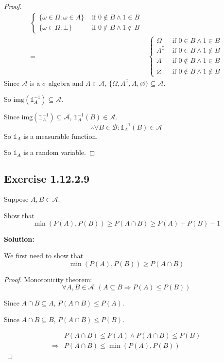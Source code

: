 \documentclass{article}
\begin{document}
\begin{proof}
\begin{align*}
\begin{cases}
    \{\omega\in\Omega:\omega\in A\}&\text{ if }0\notin B\wedge 1\in B\\
    \{\omega\in\Omega:\bot\}&\text{ if }0\notin B\wedge 1\notin B
    \end{cases} \\
    =& \begin{cases}
    \Omega &\text{ if }0\in B\wedge 1\in B\\
    A^\complement&\text{ if }0\in B\wedge 1\notin B\\
    A&\text{ if }0\notin B\wedge 1\in B\\
    \varnothing&\text{ if }0\notin B\wedge 1\notin B
    \end{cases}
\end{align*}
Since \(\mathcal{A}\) is a \(\sigma\)-algebra and \(A\in \mathcal{A}\), \(\{\Omega, A^\complement, A, \varnothing\}\subseteq \mathcal{A}\).

So \(\mathrm{img}(\mathds{1}_A^{-1}) \subseteq \mathcal{A}\).

Since \(\mathrm{img}(\mathds{1}_A^{-1})\subseteq \mathcal{A}\), \(\mathds{1}_A^{-1}(B)\in \mathcal{A}\).
\[\therefore \forall B\in \mathcal{B}: \mathds{1}_A^{-1}(B)\in \mathcal{A}\]
So \(\mathds{1}_A\) is a measurable function.

So \(\mathds{1}_A\) is a random variable.
\end{proof}

\subsection{Exercise 1.12.2.9}

Suppose \(A,B \in \mathcal{A}\).

Show that
\[\min(P(A),P(B)) \geq P(A\cap B) \geq P(A)+P(B)-1\]

\textbf{Solution:}

We first need to show that
\[\min(P(A), P(B)) \geq P(A \cap B)\]

\begin{proof}
Monotonicity theorem:
\[\forall A,B\in \mathcal{A}: (A\subseteq B \Rightarrow P(A)\leq P(B))\]

Since \(A\cap B \subseteq A\), \(P(A\cap B) \leq P(A)\).

Since \(A\cap B \subseteq B\), \(P(A\cap B) \leq P(B)\).

\begin{align*}
	 & P(A\cap B)\leq P(A) \wedge P(A\cap B)\leq P(B) \\
	\Rightarrow & P(A \cap B) \leq \min(P(A), P(B))
\end{align*}
\end{proof}
\end{document}
